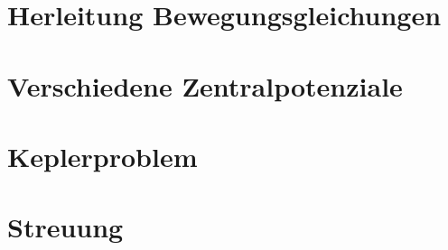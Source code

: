 \section{Herleitung Bewegungsgleichungen}

\section{Verschiedene Zentralpotenziale}

\section{Keplerproblem}

\section{Streuung}